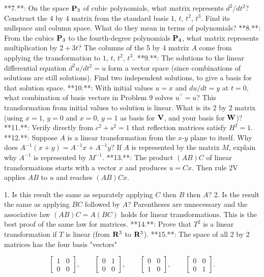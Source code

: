 

**7.**: On the space \({\bf P}_{3}\) of cubic polynomials, what matrix represents \(d^{2}/dt^{2}\)? Construct the 4 by 4 matrix from the standard basis \(1\), \(t\), \(t^{2}\), \(t^{3}\). Find its nullspace and column space. What do they mean in terms of polynomials?
**8.**: From the cubics \({\bf P}_{3}\) to the fourth-degree polynomials \({\bf P}_{4}\), what matrix represents multiplication by \(2+3t\)? The columns of the 5 by 4 matrix \(A\) come from applying the transformation to \(1\), \(t\), \(t^{2}\), \(t^{3}\).
**9.**: The solutions to the linear differential equation \(d^{2}u/dt^{2}=u\) form a vector space (since combinations of solutions are still solutions). Find two independent solutions, to give a basis for that solution space.
**10.**: With initial values \(u=x\) and \(du/dt=y\) at \(t=0\), what combination of basis vectors in Problem 9 solves \(u^{\prime\prime}=u\)? This transformation from initial values to solution is linear. What is its 2 by 2 matrix (using \(x=1\), \(y=0\) and \(x=0\), \(y=1\) as basis for \({\bf V}\), and your basis for \({\bf W}\))?
**11.**: Verify directly from \(c^{2}+s^{2}=1\) that reflection matrices satisfy \(H^{2}=1\).
**12.**: Suppose \(A\) is a linear transformation from the \(x\)-\(y\) plane to itself. Why does \(A^{-1}(x+y)=A^{-1}x+A^{-1}y\)? If \(A\) is represented by the matrix \(M\), explain why \(A^{-1}\) is represented by \(M^{-1}\).
**13.**: The product \((AB)C\) of linear transformations starts with a vector \(x\) and produces \(u=Cx\). Then rule 2V applies \(AB\) to \(u\) and reaches \((AB)Cx\).

1. Is this result the same as separately applying \(C\) then \(B\) then \(A\)?
2. Is the result the same as applying \(BC\) followed by \(A\)? Parentheses are unnecessary and the associative law \((AB)C=A(BC)\) holds for linear transformations. This is the best proof of the same law for matrices.
**14.**: Prove that \(T^{2}\) is a linear transformation if \(T\) is linear (from \({\bf R}^{3}\) to \({\bf R}^{3}\)).
**15.**: The space of all 2 by 2 matrices has the four basis "vectors"

\[\left[\begin{matrix}1&0\\ 0&0\end{matrix}\right],\qquad\left[\begin{matrix}0&1\\ 0&0\end{matrix}\right],\qquad\left[\begin{matrix}0&0\\ 1&0\end{matrix}\right],\qquad\left[\begin{matrix}0&0\\ 0&1\end{matrix}\right].\]

